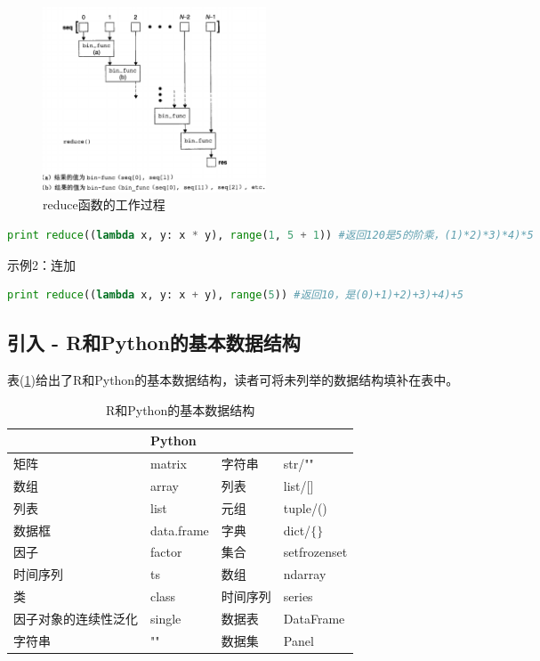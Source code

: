             \begin{figure}[H]
            \centering
            \includegraphics[height=5.5cm]{images/reduce_fuc_workprocess.jpg}
            \caption{reduce函数的工作过程}
            \label{fig:reduce函数的工作过程}
            \end{figure}
                \begin{lstlisting}[language=Python]
            print reduce((lambda x, y: x * y), range(1, 5 + 1)) #返回120是5的阶乘，(1)*2)*3)*4)*5
                \end{lstlisting}
            示例2：连加
                \begin{lstlisting}[language=Python]
            print reduce((lambda x, y: x + y), range(5)) #返回10，是(0)+1)+2)+3)+4)+5
                \end{lstlisting}
    \subsection{引入 - R和Python的基本数据结构}
            表(\ref{tab:R和Python的基本数据结构})给出了R和Python的基本数据结构，读者可将未列举的数据结构填补在表中。
            \begin{table}[H]
            \centering
            \caption{R和Python的基本数据结构}
            \label{tab:R和Python的基本数据结构}
                \begin{tabularx}{\textwidth}{lXlX}
                \toprule
            \rowcolor{lightgray}\multicolumn{2}{l}{R}&\multicolumn{2}{l}{Python}\\\midrule
                矩阵& matrix& 字符串& str/""\\
                数组 & array&列表  &list/[]\\
                列表 & list&元组 & tuple/()\\
                数据框& data.frame&字典 & dict/$\{\}$\\
                因子 & factor&集合 & set\/frozenset\\
                时间序列 & ts&数组 & ndarray\\
                类 &class&时间序列 & series\\
                因子对象的连续性泛化 & single&数据表& DataFrame\\
                字符串& ""&数据集 &Panel\\
                \bottomrule
                \end{tabularx}
                \end{table}
